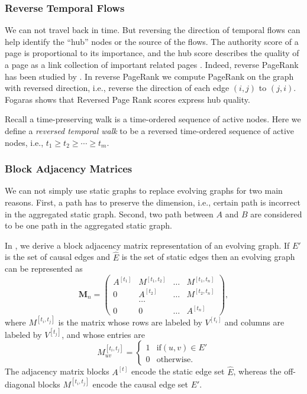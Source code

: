 \documentclass[12pt]{article}
\theoremstyle{definition}
\begin{document}
\subsubsection{Reverse Temporal Flows}

We can not travel back in time. But reversing the direction of temporal flows can help
identify the ``hub'' nodes or the source of the flows. The authority score of a page is
proportional to its importance, and the hub score describes the quality of a page as a link collection of important related pages \cite{kleinberg99}.
Indeed, reverse PageRank has
been studied by \cite{bar08, fogaras03, gleich15}. In reverse PageRank we compute PageRank on the graph with reversed direction, i.e., reverse the direction of each edge $(i,j)$ to $(j, i)$.
Fogaras \cite{fogaras03} shows that Reversed Page Rank scores express hub quality.


Recall a time-preserving walk is a time-ordered sequence of active nodes. Here we define a \emph{reversed temporal walk} to be a reversed time-ordered sequence of active nodes, i.e.,
$t_1 \ge t_2 \ge \cdots \ge t_m$.


\subsubsection{Block Adjacency Matrices}
\label{sec:centr-block-adjac}

We can not simply use static graphs to replace evolving graphs for two main reasons.
First, a path has to preserve the dimension, i.e., certain path is incorrect in the aggregated static graph.
Second, two path between $A$ and $B$ are considered to be one path in the aggregated static graph.

In \cite{chen16}, we derive a block adjacency matrix representation of an evolving graph.
If $E'$ is the set of causal edges and $\hat E$ is the set of static edges then
an evolving graph can be represented as
$$
\bm M_n =
\begin{pmatrix}
A^{[t_1]} & M^{[t_1, t_2]} & \ldots & M^{[t_1, t_n]} \\
0         & A^{[t_2]} & \ldots & M^{[t_2, t_n]} \\
          & \ldots    &        &     \\
0         & 0         & \ldots & A^{[t_n]}
\end{pmatrix},
$$
where $M^{[t_i, t_j]}$ is the matrix whose rows are labeled by $V^{[t_i]}$ and columns are labeled by $V^{[t_j]}$, and whose entries are
$$
  M_{uv}^{[t_i, t_j]} =
  \begin{cases}
    1 & \mbox{if} (u, v) \in E' \\
    0 & \mbox{otherwise}.
  \end{cases}
$$
The adjacency matrix blocks $A^{[t]}$ encode the static edge set $\hat E$, whereas the off-diagonal blocks $M^{[t_i, t_j]}$ encode the causal edge set $E'$.
\end{document}
